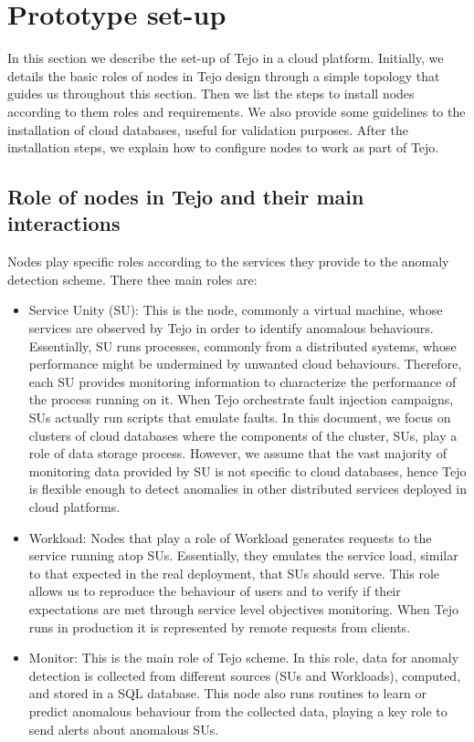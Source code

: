 \section{Prototype set-up}

In this section we describe the set-up of Tejo in a cloud platform. Initially, we details the basic roles of nodes in Tejo design through a simple topology that guides us throughout this section. Then we list the steps to install nodes according to them roles and requirements. We also provide some guidelines to the installation of cloud databases, useful for validation purposes. After the installation steps, we explain how to configure nodes to work as part of Tejo.

\subsection{Role of nodes in Tejo and their main interactions}
\label{subsec:roles}

Nodes play specific roles according to the services they provide to the anomaly detection scheme. There thee main roles are:

\begin{itemize}
	\item Service Unity (SU): This is the node, commonly a virtual machine, whose services are observed by Tejo in order to identify anomalous behaviours. Essentially, SU runs processes, commonly from a distributed systems, whose performance might be undermined by unwanted cloud behaviours. Therefore, each SU provides monitoring information to characterize the performance of the process running on it. When Tejo orchestrate fault injection campaigns, SUs actually run scripts that emulate faults. In this document, we focus on clusters of cloud databases where the components of the cluster, SUs, play a role of data storage process. However, we assume that the vast majority of monitoring data provided by SU is not specific to cloud databases, hence Tejo is flexible enough to detect anomalies in other distributed services deployed in cloud platforms.
	\item Workload: Nodes that play a role of Workload generates requests to the service running atop SUs. Essentially, they emulates the service load, similar to that expected in the real deployment, that SUs should serve. This role allows us to reproduce the behaviour of users and to verify if their expectations are met through service level objectives monitoring. When Tejo runs in production it is represented by remote requests from clients. 
	\item Monitor: This is the main role of Tejo scheme. In this role, data for anomaly detection is collected from different sources (SUs and Workloads), computed, and stored in a SQL database. This node also runs routines to learn or predict anomalous behaviour from the collected data, playing a key role to send alerts about anomalous SUs. 
\end{itemize} 


